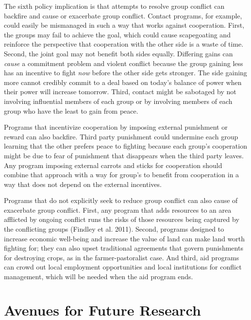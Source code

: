 \documentclass[11pt]{article}
\begin{document}
The sixth policy implication is that attempts to resolve group conflict
can backfire and cause or exacerbate group conflict. Contact programs,
for example, could easily be mismanaged in such a way that works against
cooperation. First, the groups may fail to achieve the goal, which could
cause scapegoating and reinforce the perspective that cooperation with
the other side is a waste of time. Second, the joint goal may not
benefit both sides equally. Differing gains can \emph{cause} a
commitment problem and violent conflict because the group gaining less
has an incentive to fight \emph{now} before the other side gets
stronger. The side gaining more cannot credibly commit to a deal based
on today's balance of power when their power will increase tomorrow.
Third, contact might be sabotaged by not involving influential members
of each group or by involving members of each group who have the least
to gain from peace.

Programs that incentivize cooperation by imposing external punishment or
reward can also backfire. Third party punishment could undermine each
group learning that the other prefers peace to fighting because each
group's cooperation might be due to fear of punishment that disappears
when the third party leaves. Any program imposing external carrots and
sticks for cooperation should combine that approach with a way for
group's to benefit from cooperation in a way that does not depend on the
external incentives.

Programs that do not explicitly seek to reduce group conflict can also
cause of exacerbate group conflict. First, any program that adds
resources to an area afflicted by ongoing conflict runs the risks of
those resources being captured by the conflicting groups (Findley et al.
2011). Second, programs designed to increase economic well-being and
increase the value of land can make land worth fighting for; they can
also upset traditional agreements that govern punishments for destroying
crops, as in the farmer-pastoralist case. And third, aid programs can
crowd out local employment opportunities and local institutions for
conflict management, which will be needed when the aid program ends.

\hypertarget{avenues-for-future-research}{%
\section{Avenues for Future
Research}\label{avenues-for-future-research}}
\end{document}
